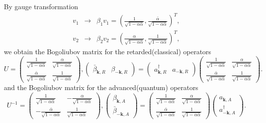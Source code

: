\documentclass[aps,onecolumn,superscriptaddress,notitlepage,longbibliography]{revtex4-1}
\newcommand{\tmmathbf}[1]{\ensuremath{\boldsymbol{#1}}}
\begin{document}
By gauge transformation
\begin{eqnarray}
  v_1 & \rightarrow & \beta_1 v_1 = \left( \frac{1}{\sqrt{1 - \alpha
  \bar{\alpha}}}, \frac{\bar{\alpha}}{\sqrt{1 - \alpha \bar{\alpha}}}
  \right)^T, \\
  v_2 & \rightarrow & \beta_2 v_2 = \left( \frac{\alpha}{\sqrt{1 - \alpha
  \bar{\alpha}}}, \frac{1}{\sqrt{1 - \alpha \bar{\alpha}}} \right)^T, 
\end{eqnarray}
we obtain the Bogoliubov matrix for the retarded(classical) operators
\begin{equation}
  U = \left(\begin{array}{cc}
    \frac{1}{\sqrt{1 - \alpha \bar{\alpha}}} & \frac{\alpha}{\sqrt{1 - \alpha
    \bar{\alpha}}}\\
    \frac{\bar{\alpha}}{\sqrt{1 - \alpha \bar{\alpha}}} & \frac{1}{\sqrt{1 -
    \alpha \bar{\alpha}}}
  \end{array}\right), \left(\begin{array}{cc}\bar{\beta}_{\tmmathbf{k}, R} &
    \beta_{- \tmmathbf{k}, R}\end{array}\right) = \left(\begin{array}{cc}a^{\dagger}_{\tmmathbf{k}, R} &
    a_{- \tmmathbf{k}, R}\end{array}\right)\left(\begin{array}{cc}
    \frac{1}{\sqrt{1 - \alpha \bar{\alpha}}} & \frac{\alpha}{\sqrt{1 - \alpha
    \bar{\alpha}}}\\
    \frac{\bar{\alpha}}{\sqrt{1 - \alpha \bar{\alpha}}} & \frac{1}{\sqrt{1 -
    \alpha \bar{\alpha}}}
  \end{array}\right).\label{Eq:bogoliubov1}
\end{equation}
and the Bogoliubov matrix for the advanced(quantum) operators
\begin{equation}
  U^{- 1} = \left(\begin{array}{cc}
    \frac{1}{\sqrt{1 - \alpha \bar{\alpha}}} & - \frac{\alpha}{\sqrt{1 -
    \alpha \bar{\alpha}}}\\
    - \frac{\bar{\alpha}}{\sqrt{1 - \alpha \bar{\alpha}}} & \frac{1}{\sqrt{1 -
    \alpha \bar{\alpha}}}
  \end{array}\right), \left(\begin{array}{c}
    \beta_{\tmmathbf{k}, A}\\
    \bar{\beta}_{- \tmmathbf{k}, A}
  \end{array}\right) = \left(\begin{array}{cc}
    \frac{1}{\sqrt{1 - \alpha \bar{\alpha}}} & \frac{\alpha}{\sqrt{1 - \alpha
    \bar{\alpha}}}\\
    \frac{\bar{\alpha}}{\sqrt{1 - \alpha \bar{\alpha}}} & \frac{1}{\sqrt{1 -
    \alpha \bar{\alpha}}}
  \end{array}\right) \left(\begin{array}{c}
    a_{\tmmathbf{k}, A}\\
    a^{\dagger}_{- \tmmathbf{k}, A}
  \end{array}\right) . \label{Eq:bogoliubov2}
\end{equation}
\end{document}
